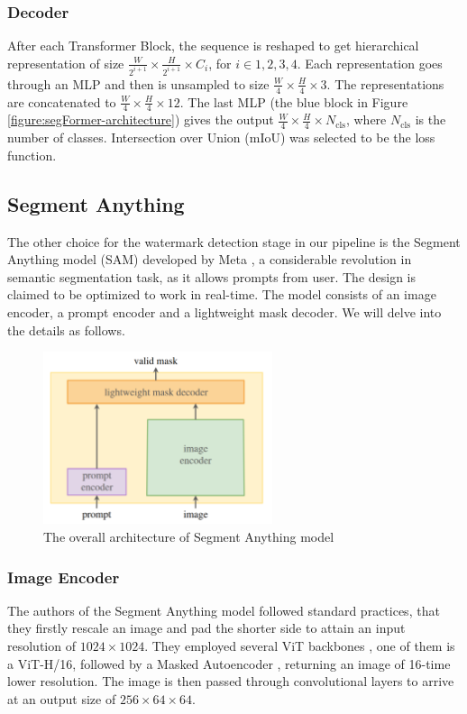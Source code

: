 \subsubsection{Decoder}
After each Transformer Block, the sequence is reshaped to get hierarchical representation of size $\frac{W}{2^{i+1}}\times \frac{H}{2^{i+1}}\times C_i$, for $i\in{1,2,3,4}$. Each representation goes through an MLP and then is unsampled to size $\frac{W}{4}\times \frac{H}{4}\times 3$. The representations are concatenated to $\frac{W}{4}\times \frac{H}{4}\times 12$. The last MLP (the blue block in Figure \ref{figure:segFormer-architecture}) gives the output $\frac{W}{4}\times \frac{H}{4}\times N_{\mathrm{cls}}$, where $N_{\mathrm{cls}}$ is the number of classes. Intersection over Union (mIoU) was selected to be the loss function.

\subsection{Segment Anything}
\label{sec:intro-sam}
The other choice for the watermark detection stage in our pipeline is the Segment Anything model (SAM) developed by Meta \cite{kirillov2023segment}, a considerable revolution in semantic segmentation task, as it allows prompts from user. The design is claimed to be optimized to work in real-time. The model consists of an image encoder, a prompt encoder and a lightweight mask decoder. We will delve into the details as follows.

\begin{figure}
  \centering
  \includegraphics[width=0.6\textwidth]{img/segment-anything-model.png}
  \vspace{0.25cm}
  \caption[The overall architecture of Segment Anything model]{The overall architecture of Segment Anything model \cite{kirillov2023segment}}
\end{figure}

\subsubsection{Image Encoder}
The authors of the Segment Anything model followed standard practices, that they firstly rescale an image and pad the shorter side to attain an input resolution of $1024\times1024$. They employed several ViT backbones \cite{dosovitskiy2020image}, one of them is a ViT-H/16, followed by a Masked Autoencoder \cite{he2022masked}, returning an image of 16-time lower resolution. The image is then passed through convolutional layers to arrive at an output size of $256\times 64\times 64$.

